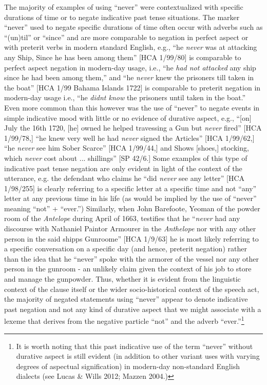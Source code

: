 \documentclass[12pt]{article}
\newenvironment{styleStandard}{\renewcommand\baselinestretch{1.0}\setlength\leftskip{0cm}\setlength\rightskip{0cm plus 1fil}\setlength\parindent{0cm}\setlength\parfillskip{0pt plus 1fil}\setlength\parskip{0in plus 1pt}\writerlistparindent\writerlistleftskip\leavevmode\normalfont\normalsize\writerlistlabel\ignorespaces}{\unskip\vspace{0in plus 1pt}\par}
\newcommand\writerlistleftskip{}
\newcommand\writerlistparindent{}
\newcommand\writerlistlabel{}
\begin{document}
\begin{styleStandard}
The majority of examples of using “never” were contextualized with specific durations of time or to negate indicative past tense situations. The marker “never” used to negate specific durations of time often occur with adverbs such as “(un)til” or “since” and are more comparable to negation in perfect aspect or with preterit verbs in modern standard English, e.g., “he \textit{never }was at attacking any Ship, Since he has been among them” [HCA 1/99/80] is comparable to perfect aspect negation in modern-day usage, i.e., “he \textit{had not attacked} any ship since he had been among them,” and “he \textit{never} knew the prisoners till taken in the boat” [HCA 1/99 Bahama Islands 1722] is comparable to preterit negation in modern-day usage i.e., “he \textit{didn{\textquotesingle}t know} the prisoners until taken in the boat.” Even more common than this however was the use of “never” to negate events in simple indicative mood with little or no evidence of durative aspect, e.g., “[on] July the 16th 1720, [he] owned he helped travessing a Gun but \textit{never} fired” [HCA 1/99/78,] “he knew very well he had \textit{never }signed the Articles” [HCA 1/99/62,] “he \textit{never} see him Sober Scarce” [HCA 1/99/44,] and {\textquotedbl}Shows [shoes,] stocking, which \textit{never} cost about ... shillings” [SP 42/6.] Some examples of this type of indicative past tense negation are only evident in light of the context of the utterance, e.g. the defendant who claims he “did \textit{never} see any letter” [HCA 1/98/255] is clearly referring to a specific letter at a specific time and not “any” letter at any previous time in his life (as would be implied by the use of “never” meaning “not” + “ever.”) Similarly, when John Barefoote, Yeoman of the powder room of the \textit{Antelope} during April of 1663, testifies that he “\textit{never }had any discourse with Nathaniel Paintor Armourer in the \textit{Anthelope} nor with any other person in the said shipps Gunroome” [HCA 1/9/63] he is most likely referring to a specific conversation on a specific day (and hence, preterit negation) rather than the idea that he “never” spoke with the armorer of the vessel nor any other person in the gunroom - an unlikely claim given the context of his job to store and manage the gunpowder. Thus, whether it is evident from the linguistic context of the clause itself or the wider socio-historical context of the speech act, the majority of negated statements using “never” appear to denote indicative past negation and not any kind of durative aspect that we might associate with a lexeme that derives from the negative particle “not” and the adverb “ever.”\footnote{ It is worth noting that this past indicative use of the term “never” without durative aspect is still evident (in addition to other variant uses with varying degrees of aspectual signification) in modern-day non-standard English dialects (see Lucas \& Wills 2012; Mazzen 2004.) } 
\end{styleStandard}
\end{document}
